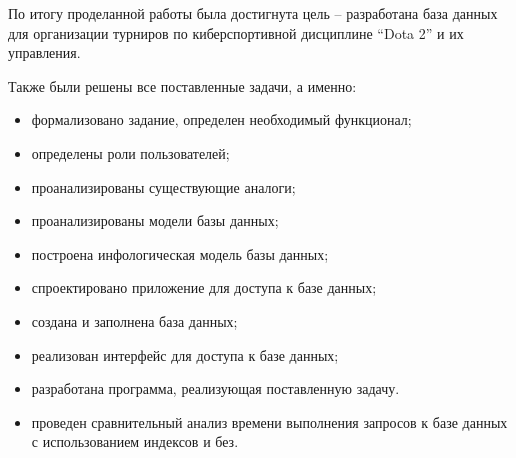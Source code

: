 
По итогу проделанной работы была достигнута цель – разработана база данных для организации турниров по киберспортивной дисциплине “Dota 2” и их управления.

Также были решены все поставленные задачи, а именно:
\begin{itemize}
	\item формализовано задание, определен необходимый функционал;
	\item определены роли пользователей;
	\item проанализированы существующие аналоги;
	\item проанализированы модели базы данных;
	\item построена инфологическая модель базы данных;
	\item спроектировано приложение для доступа к базе данных;
	\item создана и заполнена база данных;
	\item реализован интерфейс для доступа к базе данных;
	\item разработана программа, реализующая поставленную задачу.
	\item проведен сравнительный анализ времени выполнения запросов к базе данных с использованием индексов и без.
\end{itemize}